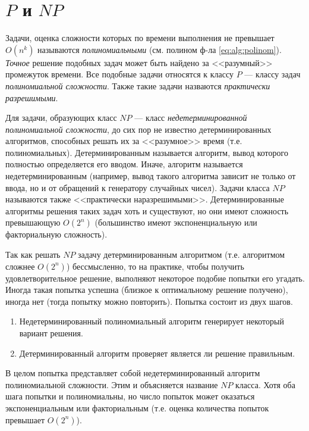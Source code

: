\section{$P$ и $NP$}

Задачи, оценка сложности которых по времени выполнения не превышает $O(n^k)$ называются \emph{полиномиальными} (см. полином ф-ла \eqref{eq:alg:polinom}). \emph{Точное} решение подобных задач может быть найдено за <<разумный>> промежуток времени. Все подобные задачи относятся к классу $P$ --- классу задач \emph{полиномиальной сложности}. Также такие задачи назваются \emph{практически разрешимыми}.

Для задачи, образующих класс $NP$ --- класс \emph{недетерминированной полиномиальной сложности}, до сих пор не известно детерминированных алгоритмов, способных решать их за <<разумное>> время (т.е. полиномиальных). Детерминированным называется алгоритм, вывод которого полностью определяется его вводом. Иначе, алгоритм называется недетерминированным (например, вывод такого алгоритма зависит не только от ввода, но и от обращений к генератору случайных чисел). Задачи класса $NP$ называются также <<практически наразрешимыми>>. Детерминированные алгоритмы решения таких задач хоть и существуют, но они имеют сложность превышающую $O(2^n)$ (большинство имеют экспоненциальную или факториальную сложность). 

Так как решать $NP$ задачу детерминированным алгоритмом (т.е. алгоритмом сложнее $O(2^n)$) бессмысленно, то на практике, чтобы получить удовлетворительное решение, выполняют некоторое подобие попытки его угадать. Иногда такая попытка успешна (близкое к оптимальному решение получено), иногда нет (тогда попытку можно повторить). Попытка состоит из двух шагов.

\begin{enumerate}
    \item Недетерминированный полиномиальный алгоритм генерирует некоторый вариант решения.
    \item Детерминированный алгоритм проверяет является ли решение правильным.
\end{enumerate}

В целом попытка представляет собой недетерминированный алгоритм полиномиальной сложности. Этим и объясняется название $NP$ класса. Хотя оба шага попытки и полиномиальны, но число попыток может оказаться экспоненциальным или факториальным (т.е. оценка количества попыток превышает $O(2^n)$).

